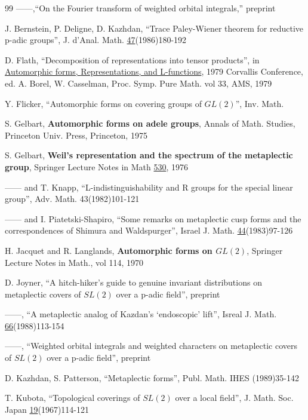 \begin{thebibliography}{99}
 ------,``On the Fourier transform of weighted
orbital integrals,'' preprint

 J. Bernstein, P. Deligne, D. Kazhdan, ``Trace
Paley-Wiener theorem for
reductive p-adic groups'', J. d'Anal. Math. \underline{47}(1986)180-192

 D. Flath, ``Decomposition of representations into tensor
products'', in
\underline{Automorphic forms, }
\underline{Representations, } \underline{and
L-functions}, 1979 Corvallis Conference, ed. A. Borel, W. Casselman,
Proc. Symp. Pure Math. vol 33, AMS, 1979

Y. Flicker, ``Automorphic forms on covering groups of $GL(2)$'', Inv.
Math.

 S. Gelbart, {\bf Automorphic forms on adele groups}, 
Annals of
Math. Studies, Princeton Univ. Press, Princeton, 1975

 S. Gelbart, {\bf Weil's representation and the 
spectrum of the metaplectic group},
Springer Lecture Notes in Math \underline{530}, 1976

 ------ and T. Knapp, ``L-indistinguishability and R 
groups for the
special linear group'', Adv. Math. 43(1982)101-121

 ------ and I. Piatetski-Shapiro, ``Some remarks 
on metaplectic cusp
forms and the correspondences of Shimura and Waldspurger'', Israel 
J. Math.
\underline{44}(1983)97-126

 H. Jacquet and R. Langlands,
{\bf Automorphic forms on $GL(2)$}, Springer Lecture Notes in Math.,
vol 114, 1970

 D. Joyner, 
``A hitch-hiker's guide to genuine invariant distributions
on metaplectic covers of $SL(2)$ over a p-adic field'', preprint

 ------, 
``A metaplectic analog of Kazdan's `endoscopic' lift'', Isreal
J. Math. \underline{66}(1988)113-154

 ------, 
``Weighted orbital integrals and weighted characters
on metaplectic covers of $SL(2)$ over a p-adic field'', preprint

 D. Kazhdan, S. Patterson, ``Metaplectic forms'', Publ. Math.
IHES (1989)35-142

T. Kubota, ``Topological coverings of $SL(2)$ over a local field'', J.
Math. Soc. Japan \underline{19}(1967)114-121


\end{thebibliography}
